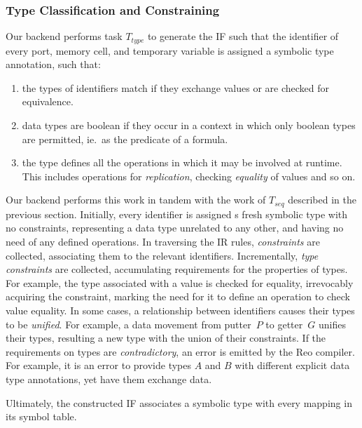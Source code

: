 \subsubsection{Type Classification and Constraining}
Our backend performs task $T_{type}$ to generate the IF such that the identifier of every port, memory cell, and temporary variable is assigned a symbolic type annotation, such that:
\begin{enumerate}
	\item the types of identifiers match if they exchange values or are checked for equivalence.
	\item data types are boolean if they occur in a context in which only boolean types are permitted, ie.\ as the predicate of a formula.
	\item the type defines all the operations in which it may be involved at runtime. This includes operations for \textit{replication}, checking \textit{equality} of values and so on.
\end{enumerate}

Our backend performs this work in tandem with the work of $T_{seq}$ described in the previous section. Initially, every identifier is assigned s fresh symbolic type with no constraints, representing a data type unrelated to any other, and having no need of any defined operations. In traversing the IR rules, \textit{constraints} are collected, associating them to the relevant identifiers. Incrementally, \textit{type constraints} are collected, accumulating requirements for the properties of types. For example, the type associated with a value is checked for equality, irrevocably acquiring the  constraint, marking the need for it to define an operation to check value equality. In some cases, a relationship between identifiers causes their types to be \textit{unified}. For example, a data movement from putter~$P$ to getter~$G$ unifies their types, resulting a new type with the union of their constraints. If the requirements on types are \textit{contradictory}, an error is emitted by the Reo compiler. For example, it is an error to provide types $A$ and $B$ with different explicit data type annotations, yet have them exchange data.

Ultimately, the constructed IF associates a symbolic type with every mapping in its symbol table.

